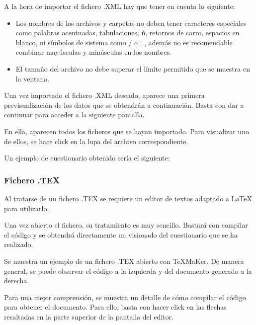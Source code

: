 A la hora de importar el fichero .XML hay que tener en cuenta lo siguiente:
\begin{itemize}
\item Los nombres de los archivos y carpetas no deben tener caracteres especiales como palabras acentuadas, tabulaciones, ñ, retornos de carro, espacios en blanco, ni símbolos de sistema como / o : , además no es recomendable combinar mayúsculas y minúsculas en los nombres.
\item El tamaño del archivo no debe superar el límite permitido que se muestra en la ventana.

\end{itemize} 

Una vez importado el fichero .XML deseado, aparece una primera previsualización de los datos que se obtendrán a continuación. Basta con dar a continuar para acceder a la siguiente pantalla.

En ella, aparecen todos los ficheros que se hayan importado. Para visualizar uno de ellos, se hace click en la lupa del archivo correspondiente.

Un ejemplo de cuestionario obtenido sería el siguiente:
\subsubsection{Fichero .TEX}

Al tratarse de un fichero .TEX se requiere un editor de textos adaptado a \LaTeX{} para utilizarlo.

Una vez abierto el fichero, su tratamiento es muy sencillo. Bastará con compilar el código y se obtendrá directamente un visionado del cuestionario que se ha realizado.

Se muestra un ejemplo de un fichero .TEX abierto con \TeX{}MaKer. De manera general, se puede observar el código a la izquierda y del documento generado a la derecha.


Para una mejor comprensión, se muestra un detalle de cómo compilar el código para obtener el documento. Para ello, basta con hacer click en las flechas resaltadas en la parte superior de la pantalla del editor.

